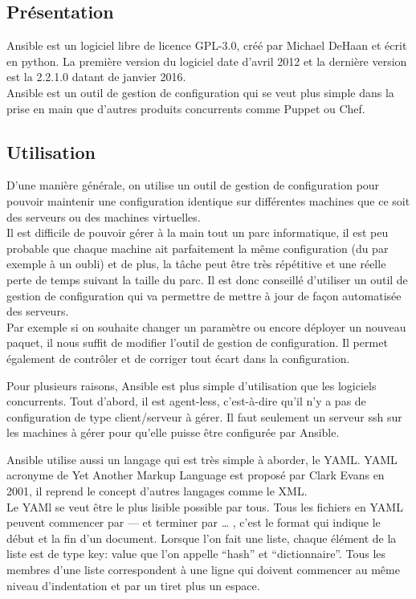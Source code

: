 \documentclass[]{article}
\begin{document}
\subsection{Présentation}\label{pruxe9sentation}
Ansible est un logiciel libre de licence GPL-3.0, créé par Michael
DeHaan et écrit en python. La première version du logiciel date d'avril
2012 et la dernière version est la 2.2.1.0 datant de janvier 2016. \\
Ansible est un outil de gestion de configuration qui se veut plus simple
dans la prise en main que d'autres produits concurrents comme Puppet ou
Chef.

\subsection{Utilisation}\label{utilisation}
D'une manière générale, on utilise un outil de gestion de configuration
pour pouvoir maintenir une configuration identique sur différentes
machines que ce soit des serveurs ou des machines virtuelles. \\
Il est difficile de pouvoir gérer à la main tout un parc informatique, il est
peu probable que chaque machine ait parfaitement la même configuration
(du par exemple à un oubli) et de plus, la tâche peut être très
répétitive et une réelle perte de temps suivant la taille du parc. Il
est donc conseillé d'utiliser un outil de gestion de configuration qui
va permettre de mettre à jour de façon automatisée des serveurs. \\
Par exemple si on souhaite changer un paramètre ou encore déployer un
nouveau paquet, il nous suffit de modifier l'outil de gestion de
configuration. Il permet également de contrôler et de corriger tout
écart dans la configuration.

Pour plusieurs raisons, Ansible est plus simple d'utilisation que les logiciels concurrents. Tout d'abord, il est
agent-less, c'est-à-dire qu'il n'y a pas de configuration de type
client/serveur à gérer. Il faut seulement un serveur ssh sur les
machines à gérer pour qu'elle puisse être configurée par Ansible.

Ansible utilise aussi un langage qui est très simple à aborder, le YAML.
YAML acronyme de Yet Another Markup Language est proposé par Clark Evans
en 2001, il reprend le concept d'autres langages comme le XML. \\
Le YAMl se veut être le plus lisible possible par tous. Tous les fichiers en
YAML peuvent commencer par --- et terminer par \ldots{} , c'est le
format qui indique le début et la fin d'un document. 
Lorsque l'on fait une liste, chaque élément de la liste est de type \og
key: value \fg que l'on appelle ``hash'' et
``dictionnaire''. Tous les membres d'une liste correspondent à une ligne
qui doivent commencer au même niveau d'indentation et par un tiret plus
un espace. 
\end{document}
